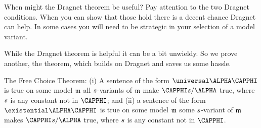 When might the Dragnet theorem be useful? 
Pay attention to the two Dragnet conditions.
When you can show that those hold there is a decent chance Dragnet can help.
In some cases you will need to be strategic in your selection of a model variant.

While the Dragnet theorem is helpful it can be a bit unwieldy.
So we prove another, the  theorem, which builds on Dragnet and saves us some hassle.

\begin{THEOREM}{ The Free Choice Theorem:}
(i) A \GQL{} sentence of the form $\universal\ALPHA\CAPPHI$ is true on some model $\mathfrak{m}$ \Iff all $s$-variants of $\mathfrak{m}$ make $\CAPPHI\variable{s}/\ALPHA$ true, where $s$ is any constant not in $\CAPPHI$; and (ii) a \GQL{} sentence of the form $\existential\ALPHA\CAPPHI$ is true on some model $\mathfrak{m}$ \Iff some $s$-variant of $\mathfrak{m}$ makes $\CAPPHI\variable{s}/\ALPHA$ true, where $s$ is any constant not in $\CAPPHI$.
\end{THEOREM}

